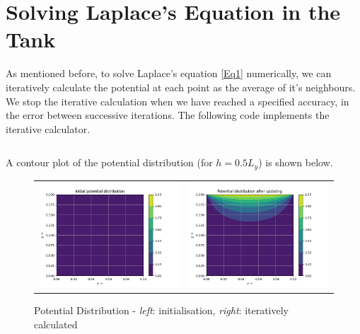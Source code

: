 \documentclass[11pt, a4paper, twoside]{report}
\begin{document}
    \section{Solving Laplace's Equation in the Tank}
        As mentioned before, to solve Laplace's equation \eqref{Eq1} numerically, we can iteratively calculate the potential at each point as the average of it's neighbours. We stop the iterative calculation when we have reached a specified accuracy, in the error between successive iterations. The following code implements the iterative calculator.

        \inputminted[linenos, breaklines=True, fontsize=\footnotesize]{python}{laplaceSolver.py}

        A contour plot of the potential distribution (for $h = 0.5L_y$) is shown below.

        \begin{figure}[H]
            \centering
            \setlength\tabcolsep{2pt}
            \begin{tabular}{c c}
                \includegraphics[scale=0.5]{Fig0.png} &
                \includegraphics[scale=0.5]{Fig1.png}\\
            \end{tabular}
            \caption{Potential Distribution - \textit{left}: initialisation, \textit{right}: iteratively calculated}
        \end{figure}
\end{document}
